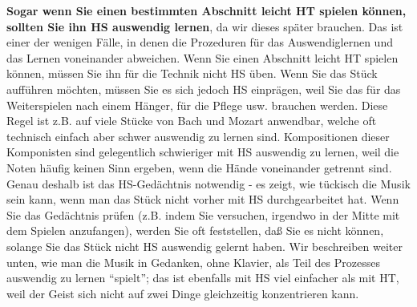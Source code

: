 \textbf{Sogar wenn Sie einen bestimmten Abschnitt leicht HT spielen können, sollten Sie ihn HS auswendig lernen}, da wir dieses später brauchen.
Das ist einer der wenigen Fälle, in denen die Prozeduren für das Auswendiglernen und das Lernen voneinander abweichen.
Wenn Sie einen Abschnitt leicht HT spielen können, müssen Sie ihn für die Technik nicht HS üben.
Wenn Sie das Stück aufführen möchten, müssen Sie es sich jedoch HS einprägen, weil Sie das für das Weiterspielen nach einem Hänger, für die Pflege usw. brauchen werden.
Diese Regel ist z.B. auf viele Stücke von Bach und Mozart anwendbar, welche oft technisch einfach aber schwer auswendig zu lernen sind.
Kompositionen dieser Komponisten sind gelegentlich schwieriger mit HS auswendig zu lernen, weil die Noten häufig keinen Sinn ergeben, wenn die Hände voneinander getrennt sind.
Genau deshalb ist das HS-Gedächtnis notwendig - es zeigt, wie tückisch die Musik sein kann, wenn man das Stück nicht vorher mit HS durchgearbeitet hat.
Wenn Sie das Gedächtnis prüfen (z.B. indem Sie versuchen, irgendwo in der Mitte mit dem Spielen anzufangen), werden Sie oft feststellen, daß Sie es nicht können, solange Sie das Stück nicht HS auswendig gelernt haben.
Wir beschreiben weiter unten, wie man die Musik in Gedanken, ohne Klavier, als Teil des Prozesses auswendig zu lernen \enquote{spielt}; das ist ebenfalls mit HS viel einfacher als mit HT, weil der Geist sich nicht auf zwei Dinge gleichzeitig konzentrieren kann.

